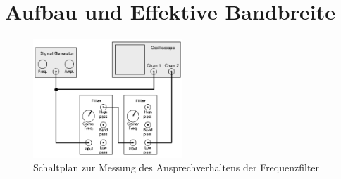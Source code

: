 \chapter{Aufbau und Effektive Bandbreite}

\begin{figure}[htbp]
    \centering
    \includegraphics[width=0.5\textwidth]{figs/schalt frequenz.png}
    \caption{Schaltplan zur Messung des Ansprechverhaltens der Frequenzfilter \cite{praktikum}}
    \label{fig:schaltfrequenz}
\end{figure}

